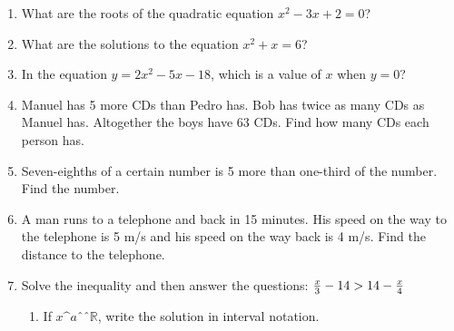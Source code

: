         
        \label{m39263*id162833}\begin{enumerate}[noitemsep, label=\textbf{\arabic*}. ] 
            \label{m39263*uid120}\item What are the roots of the quadratic equation \begin{math}{x}^{2}-3x+2=0\end{math}\hspace{1ex}?
\hspace{1ex}        
\label{m39263*uid121}\item What are the solutions to the equation \begin{math}{x}^{2}+x=6\end{math}\hspace{1ex}?
\hspace{1ex}        
\label{m39263*uid122}\item In the equation \begin{math}y=2{x}^{2}-5x-18\end{math}, which is a value of \begin{math}x\end{math} when \begin{math}y=0\end{math}\hspace{1ex}?
\hspace{1ex}        
\label{m39263*uid123}\item Manuel has 5 more CDs than Pedro has. Bob has twice as many CDs as Manuel has. Altogether the boys have 63 CDs. Find how many CDs each person has.
\hspace{1ex}        
\label{m39263*uid124}\item Seven-eighths of a certain number is 5 more than one-third of the number. Find the number.
\hspace{1ex}        
\label{m39263*uid125}\item A man runs to a telephone and back in 15 minutes. His speed on the way to the telephone is 5 m/s and his speed on the way back is 4 m/s. Find the distance to the telephone.
\hspace{1ex}        
\label{m39263*uid126}\item Solve the inequality and then answer the questions:
\begin{math}\frac{x}{3}-14>{}14-\frac{x}{4}\end{math}\label{m39263*id163069}\begin{enumerate}[noitemsep, label=\textbf{\alph*}. ] 
            \label{m39263*uid127}\item If \begin{math}x\^{a}ˆˆ\mathbb{R}\end{math}, write the solution in interval notation.

\end{enumerate}
\end{enumerate}
